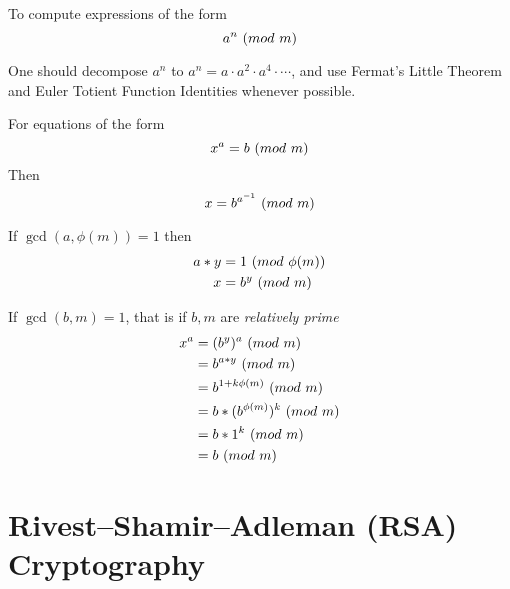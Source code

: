 \begin{remark}
    To compute expressions of the form
    \begin{equation}
        a^n \ (\relax{mod}\ m)
    \end{equation}
    
    One should decompose $a^n$ to $a^n = a \cdot a^2 \cdot a^4 \cdot \cdots$, and use Fermat's Little Theorem and Euler Totient Function Identities whenever possible.
\end{remark}

\begin{remark}
    For equations of the form
    \begin{equation}
        x^a = b \ (\relax{mod}\ m)
    \end{equation}
    Then
    \begin{equation}
        x = b^{{a}^{-1}} \ (\relax{mod}\ m)
    \end{equation}
    
    If $\gcd(a, \phi(m)) = 1$ then
    \begin{align}
        a \ast y &= 1 \ (\relax{mod}\ \phi(m)) \\
        x        &= b^y \ (\relax{mod}\ m)
    \end{align}
    
    If $\gcd(b, m) = 1$, that is if $b, m$ are \textit{relatively prime}
    \begin{align}
        x^a &= (b^y)^a \ (\relax{mod}\ m) \\
            &= b^{a \ast y} \ (\relax{mod}\ m) \\
            &= b^{1 + k \phi(m)} \ (\relax{mod}\ m) \\
            &= b \ast (b^{\phi(m)})^k \ (\relax{mod}\ m) \\
            &= b \ast 1^k \ (\relax{mod}\ m) \\
            &= b \ (\relax{mod}\ m)
    \end{align}
\end{remark}


\section{Rivest–Shamir–Adleman (RSA) Cryptography}

